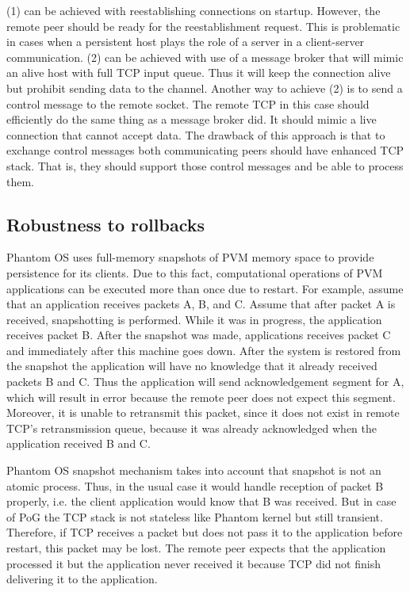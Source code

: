(1) can be achieved with reestablishing connections on startup. However, the
remote peer should be ready for the reestablishment request. This is
problematic in cases when a persistent host plays the role of a server in a
client-server communication. (2) can be achieved with use of a message broker
that will mimic an alive host with full TCP input queue. Thus it will keep the
connection alive but prohibit sending data to the channel. Another way to
achieve (2) is to send a control message to the remote socket. The remote TCP
in this case should efficiently do the same thing as a message broker did. It
should mimic a live connection that cannot accept data. The drawback of this
approach is that to exchange control messages both communicating peers should
have enhanced TCP stack. That is, they should support those control messages
and be able to process them.

\subsection {Robustness to rollbacks}

Phantom OS uses full-memory snapshots of PVM memory space to provide
persistence for its clients. Due to this fact, computational operations of PVM
applications can be executed more than once due to restart. For example,
assume that an application receives packets A, B, and C. Assume that after
packet A is received, snapshotting is performed. While it was in progress, the
application receives packet B. After the snapshot was made, applications
receives packet C and immediately after this machine goes down.  After the
system is restored from the snapshot the application will have no knowledge
that it already received packets B and C. Thus the application will send
acknowledgement segment for A, which will result in error because the remote
peer does not expect this segment.  Moreover, it is unable to retransmit this
packet, since it does not exist in remote TCP's retransmission queue, because
it was already acknowledged when the application received B and C.

Phantom OS snapshot mechanism takes into account that snapshot is not an atomic
process. Thus, in the usual case it would handle reception of packet B
properly, i.e. the client application would know that B was received. But in
case of PoG the TCP stack is not stateless like Phantom kernel but still
transient.  Therefore, if TCP receives a packet but does not pass it to the
application before restart, this packet may be lost. The remote peer expects
that the application processed it but the application never received it because
TCP did not finish delivering it to the application.

